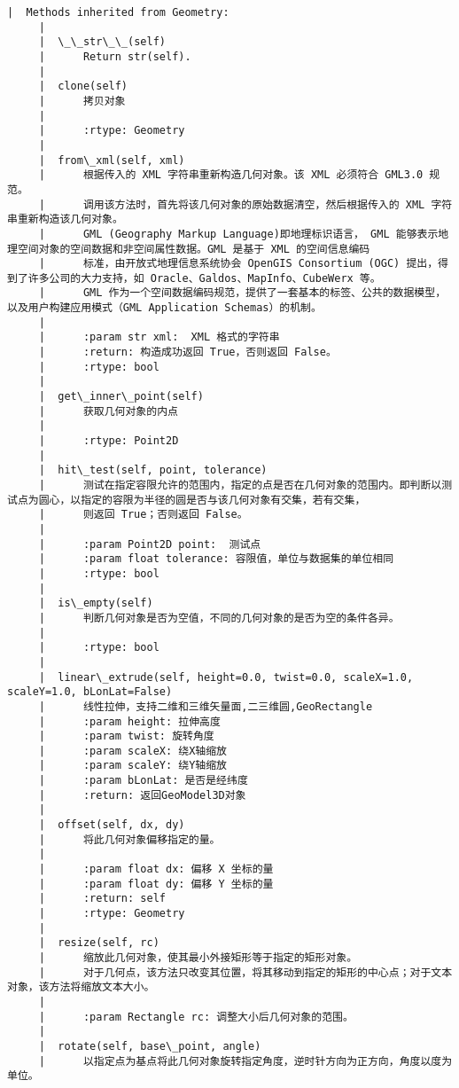 \documentclass[11pt]{article}
\begin{document}
\begin{Verbatim}[commandchars=\\\{\}]
     |  Methods inherited from Geometry:
     |  
     |  \_\_str\_\_(self)
     |      Return str(self).
     |  
     |  clone(self)
     |      拷贝对象
     |      
     |      :rtype: Geometry
     |  
     |  from\_xml(self, xml)
     |      根据传入的 XML 字符串重新构造几何对象。该 XML 必须符合 GML3.0 规范。
     |      调用该方法时，首先将该几何对象的原始数据清空，然后根据传入的 XML 字符串重新构造该几何对象。
     |      GML (Geography Markup Language)即地理标识语言， GML 能够表示地理空间对象的空间数据和非空间属性数据。GML 是基于 XML 的空间信息编码
     |      标准，由开放式地理信息系统协会 OpenGIS Consortium (OGC) 提出，得到了许多公司的大力支持，如 Oracle、Galdos、MapInfo、CubeWerx 等。
     |      GML 作为一个空间数据编码规范，提供了一套基本的标签、公共的数据模型，以及用户构建应用模式（GML Application Schemas）的机制。
     |      
     |      :param str xml:  XML 格式的字符串
     |      :return: 构造成功返回 True，否则返回 False。
     |      :rtype: bool
     |  
     |  get\_inner\_point(self)
     |      获取几何对象的内点
     |      
     |      :rtype: Point2D
     |  
     |  hit\_test(self, point, tolerance)
     |      测试在指定容限允许的范围内，指定的点是否在几何对象的范围内。即判断以测试点为圆心，以指定的容限为半径的圆是否与该几何对象有交集，若有交集，
     |      则返回 True；否则返回 False。
     |      
     |      :param Point2D point:  测试点
     |      :param float tolerance: 容限值，单位与数据集的单位相同
     |      :rtype: bool
     |  
     |  is\_empty(self)
     |      判断几何对象是否为空值，不同的几何对象的是否为空的条件各异。
     |      
     |      :rtype: bool
     |  
     |  linear\_extrude(self, height=0.0, twist=0.0, scaleX=1.0, scaleY=1.0, bLonLat=False)
     |      线性拉伸，支持二维和三维矢量面,二三维圆,GeoRectangle
     |      :param height: 拉伸高度
     |      :param twist: 旋转角度
     |      :param scaleX: 绕X轴缩放
     |      :param scaleY: 绕Y轴缩放
     |      :param bLonLat: 是否是经纬度
     |      :return: 返回GeoModel3D对象
     |  
     |  offset(self, dx, dy)
     |      将此几何对象偏移指定的量。
     |      
     |      :param float dx: 偏移 X 坐标的量
     |      :param float dy: 偏移 Y 坐标的量
     |      :return: self
     |      :rtype: Geometry
     |  
     |  resize(self, rc)
     |      缩放此几何对象，使其最小外接矩形等于指定的矩形对象。
     |      对于几何点，该方法只改变其位置，将其移动到指定的矩形的中心点；对于文本对象，该方法将缩放文本大小。
     |      
     |      :param Rectangle rc: 调整大小后几何对象的范围。
     |  
     |  rotate(self, base\_point, angle)
     |      以指定点为基点将此几何对象旋转指定角度，逆时针方向为正方向，角度以度为单位。

\end{Verbatim}
\end{document}
